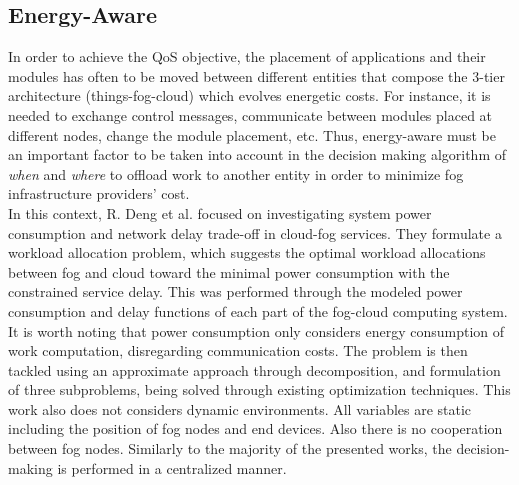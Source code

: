 
\subsection{Energy-Aware}\label{sec:energy}
In order to achieve the QoS objective, the placement of applications and their modules has often to be moved between different entities that compose the 3-tier architecture (things-fog-cloud) which evolves energetic costs. For instance, it is needed to exchange control messages, communicate between modules placed at different nodes, change the module placement, etc. Thus, energy-aware must be an important factor to be taken into account in the decision making algorithm of \textit{when} and \textit{where} to offload work to another entity in order to minimize fog infrastructure providers' cost.\\
\noindent\tab In this context, R. Deng et al. \cite{deng2016optimal} focused on investigating system power consumption and network delay trade-off in cloud-fog services. They formulate a workload allocation problem, which suggests the optimal workload allocations between fog and cloud toward the minimal power consumption with the constrained service delay. This was performed through the modeled power consumption and delay functions of each part of the fog-cloud computing system. It is worth noting that power consumption only considers energy consumption of work computation, disregarding communication costs. The problem is then tackled using an approximate approach through decomposition, and formulation of three subproblems, being solved through existing optimization techniques. This work also does not considers dynamic environments. All variables are static including the position of fog nodes and end devices. Also there is no cooperation between fog nodes. Similarly to the majority of the presented works, the decision-making is performed in a centralized manner.\\
